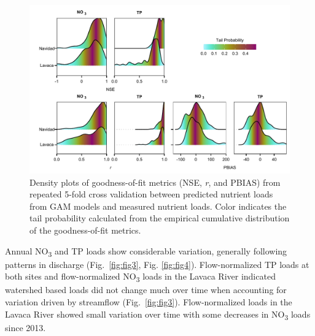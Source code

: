 \documentclass[fleqn,10pt,lineno]{wlpeerj} %
\begin{document}
\begin{figure}

{\centering \includegraphics[width=1\linewidth,]{Schramm-2023-08-PeerJ_files/figure-latex/fig2} 

}

\caption{Density plots of goodness-of-fit metrics (NSE, \textit{r}, and PBIAS) from repeated 5-fold cross validation between predicted nutrient loads from GAM models and measured nutrient loads. Color indicates the tail probability calculated from the empirical cumulative distribution of the goodness-of-fit metrics.}\label{fig:fig2}
\end{figure}

Annual NO\textsubscript{3} and TP loads show considerable variation,
generally following patterns in discharge (Fig.~\ref{fig:fig3}, Fig.
\ref{fig:fig4}). Flow-normalized TP loads at both sites and
flow-normalized NO\textsubscript{3} loads in the Lavaca River indicated
watershed based loads did not change much over time when accounting for
variation driven by streamflow (Fig.~\ref{fig:fig3}). Flow-normalized
loads in the Lavaca River showed small variation over time with some
decreases in NO\textsubscript{3} loads since 2013.
\end{document}
